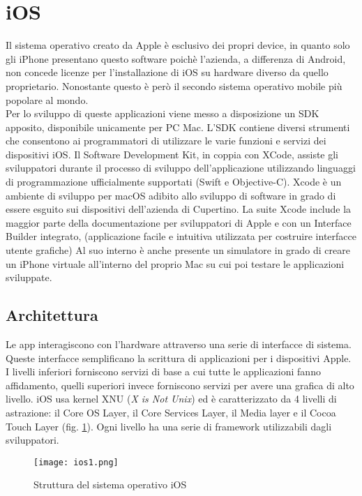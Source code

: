\section{iOS}
Il sistema operativo creato da Apple è esclusivo dei propri device, in quanto
solo gli iPhone presentano questo software poichè l'azienda, a differenza di
Android, non concede licenze per l’installazione di iOS su hardware diverso da quello
proprietario. Nonostante questo è però il secondo
sistema operativo mobile più popolare al mondo. \\
Per lo sviluppo di queste applicazioni viene messo a disposizione un SDK apposito,
disponibile unicamente per PC Mac. L’SDK contiene diversi strumenti che
consentono ai programmatori di utilizzare le varie funzioni e servizi dei
dispositivi iOS. Il Software Development Kit, in coppia con XCode, assiste gli
sviluppatori durante il processo di sviluppo dell'applicazione utilizzando
linguaggi di programmazione ufficialmente
supportati (Swift
e Objective-C). Xcode è un ambiente di sviluppo per macOS adibito allo sviluppo
di software in grado di essere esguito sui dispositivi dell'azienda di
Cupertino. La suite Xcode include la maggior parte
della documentazione per sviluppatori di Apple e con un Interface Builder integrato,
(applicazione facile e intuitiva utilizzata per costruire interfacce utente
grafiche) Al suo interno è anche presente un simulatore in grado di creare un
iPhone virtuale all'interno del proprio Mac su cui poi testare le applicazioni
sviluppate.
\subsection{Architettura}
Le app interagiscono con l’hardware attraverso una serie di interfacce di
sistema. Queste interfacce semplificano la scrittura di applicazioni per i
dispositivi Apple. I livelli inferiori forniscono servizi di base a cui tutte le
applicazioni fanno affidamento, quelli superiori invece forniscono servizi
per avere una grafica di alto livello. iOS usa kernel XNU (\textit{X is Not
Unix}) ed è caratterizzato da
4 livelli di astrazione: il Core OS Layer, il Core Services Layer, il Media layer e
il Cocoa Touch Layer (fig. \ref{ios1}). Ogni livello ha una serie di framework
utilizzabili dagli sviluppatori. 
\begin{figure}[!h]
    \centering
    \texttt{[image: ios1.png]}
    \caption{Struttura del sistema operativo iOS}
    \label{ios1}
\end{figure}

